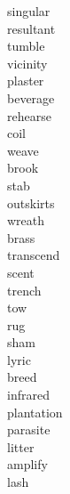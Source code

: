\documentclass[a4paper, 11pt]{ctexart}
\begin{document}
\begin{multicols*}{3}
\begin{description}
\item[singular]

\item[resultant]

\item[tumble]

\item[vicinity]

\item[plaster]

\item[beverage]

\item[rehearse]

\item[coil]

\item[weave]

\item[brook]

\item[stab]

\item[outskirts]

\item[wreath]

\item[brass]

\item[transcend]

\item[scent]

\item[trench]

\item[tow]

\item[rug]

\item[sham]

\item[lyric]

\item[breed]

\item[infrared]

\item[plantation]

\item[parasite]

\item[litter]

\item[amplify]

\item[lash]


\end{description}
\end{multicols*}
\end{document}
